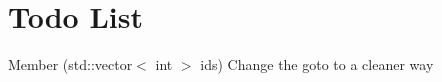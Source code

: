 \chapter{Todo List}
\hypertarget{todo}{}\label{todo}

\begin{DoxyRefList}
\item[Member \doxylink{classKMR_1_1dxlP1_1_1Reader_a55ce69b403a1961ef0e79738435b6c6b}{Reader\+::populate\+Output\+Matrix} (std\+::vector$<$ int $>$ ids)]\label{todo__todo000001}%
%
Change the goto to a cleaner way 
\end{DoxyRefList}